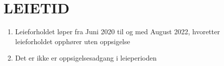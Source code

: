 \section{LEIETID}


	\begin{enumerate}

		\item Leieforholdet løper fra Juni 2020 til og med August 2022, hvoretter leieforholdet opphører uten oppsigelse

		\item Det er ikke er oppsigelsesadgang i leieperioden

	\end{enumerate}

